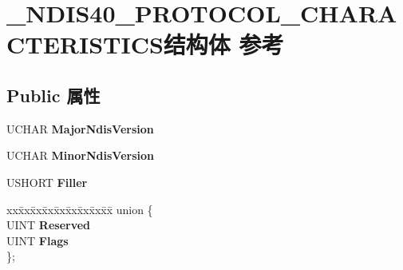 \hypertarget{struct___n_d_i_s40___p_r_o_t_o_c_o_l___c_h_a_r_a_c_t_e_r_i_s_t_i_c_s}{}\section{\+\_\+\+N\+D\+I\+S40\+\_\+\+P\+R\+O\+T\+O\+C\+O\+L\+\_\+\+C\+H\+A\+R\+A\+C\+T\+E\+R\+I\+S\+T\+I\+C\+S结构体 参考}
\label{struct___n_d_i_s40___p_r_o_t_o_c_o_l___c_h_a_r_a_c_t_e_r_i_s_t_i_c_s}
\subsection*{Public 属性}
\begin{DoxyCompactItemize}
\item 
\mbox{\label{struct___n_d_i_s40___p_r_o_t_o_c_o_l___c_h_a_r_a_c_t_e_r_i_s_t_i_c_s_a90aa319384790a0b51f205d13b1c72e5}} 
U\+C\+H\+AR {\bfseries Major\+Ndis\+Version}
\item 
\mbox{\label{struct___n_d_i_s40___p_r_o_t_o_c_o_l___c_h_a_r_a_c_t_e_r_i_s_t_i_c_s_af8ea8b87bd90bc52ba4520cd44aa670c}} 
U\+C\+H\+AR {\bfseries Minor\+Ndis\+Version}
\item 
\mbox{\label{struct___n_d_i_s40___p_r_o_t_o_c_o_l___c_h_a_r_a_c_t_e_r_i_s_t_i_c_s_a3a51f0b9515fce0e0aeff334da512164}} 
U\+S\+H\+O\+RT {\bfseries Filler}
\item 
\mbox{\label{struct___n_d_i_s40___p_r_o_t_o_c_o_l___c_h_a_r_a_c_t_e_r_i_s_t_i_c_s_a0b1958c092eedddcb567ef7caff6bbb3}} 
\begin{tabbing}
xx\=xx\=xx\=xx\=xx\=xx\=xx\=xx\=xx\=\kill
union \{\\
\>UINT {\bfseries Reserved}\\
\>UINT {\bfseries Flags}\\
\}; \\


\end{tabbing}
\end{DoxyCompactItemize}

